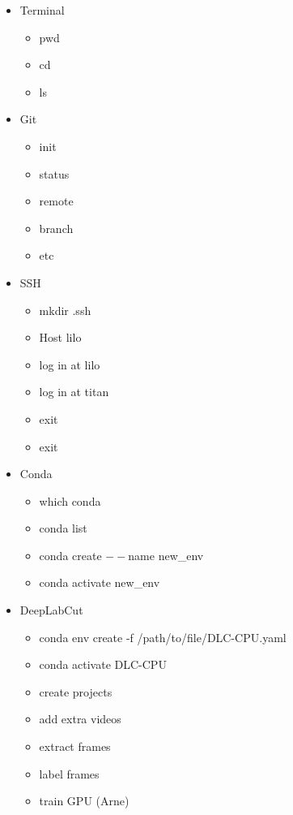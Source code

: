 \documentclass{article}
\begin{document}
\begin{itemize}
    
    \item Terminal
    \begin{itemize}
        \item pwd
        \item cd
        \item ls
    \end{itemize}
    
    \item Git
    \begin{itemize}
        \item init
        \item status
        \item remote
        \item branch
        \item etc
    \end{itemize}
    
    \item SSH
    \begin{itemize}
        \item mkdir .ssh
        \item Host lilo
        \item log in at lilo
        \item log in at titan
        \item exit
        \item exit
    \end{itemize}
    
    \item Conda
    \begin{itemize}
        \item which conda
        \item conda list
        \item conda create $--$name new\_env
        \item conda activate new\_env
    \end{itemize}

    \item DeepLabCut
    \begin{itemize}
        \item conda env create -f /path/to/file/DLC-CPU.yaml
        \item conda activate DLC-CPU
        \item create projects
        \item add extra videos
        \item extract frames
        \item label frames
        \item train GPU (Arne)
    \end{itemize}
\end{itemize}
\end{document}
